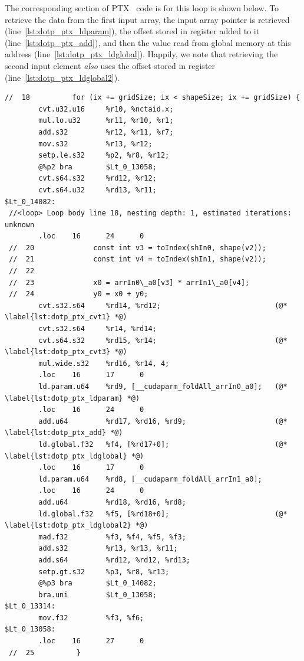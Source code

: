 The corresponding section of PTX~\cite{NVIDIA:2012vj} code is for this loop is
shown below. To retrieve the data from the first input array, the input array
pointer is retrieved (line~\ref{lst:dotp_ptx_ldparam}), the offset stored in
register  added to it (line~\ref{lst:dotp_ptx_add}), and then the
value read from global memory at this address
(line~\ref{lst:dotp_ptx_ldglobal}). Happily, we note that retrieving the second
input element \emph{also} uses the offset stored in register 
(line~\ref{lst:dotp_ptx_ldglobal2}).
%
\begin{lstlisting}[style=ptx
    ,firstnumber=103
    ,label=lst:dotp_ptx
    ,caption={Corresponding PTX code for the first step of fused dot product}]
 //  18          for (ix += gridSize; ix < shapeSize; ix += gridSize) {
        cvt.u32.u16     %r10, %nctaid.x;
        mul.lo.u32      %r11, %r10, %r1;
        add.s32         %r12, %r11, %r7;
        mov.s32         %r13, %r12;
        setp.le.s32     %p2, %r8, %r12;
        @%p2 bra        $Lt_0_13058;
        cvt.s64.s32     %rd12, %r12;
        cvt.s64.u32     %rd13, %r11;
$Lt_0_14082:
 //<loop> Loop body line 18, nesting depth: 1, estimated iterations: unknown
        .loc    16      24      0
 //  20              const int v3 = toIndex(shIn0, shape(v2));
 //  21              const int v4 = toIndex(shIn1, shape(v2));
 //  22
 //  23              x0 = arrIn0\_a0[v3] * arrIn1\_a0[v4];
 //  24              y0 = x0 + y0;
        cvt.s32.s64     %rd14, %rd12;                           (@* \label{lst:dotp_ptx_cvt1} *@)
        cvt.s32.s64     %r14, %rd14;
        cvt.s64.s32     %rd15, %r14;                            (@* \label{lst:dotp_ptx_cvt3} *@)
        mul.wide.s32    %rd16, %r14, 4;
        .loc    16      17      0
        ld.param.u64    %rd9, [__cudaparm_foldAll_arrIn0_a0];   (@* \label{lst:dotp_ptx_ldparam} *@)
        .loc    16      24      0
        add.u64         %rd17, %rd16, %rd9;                     (@* \label{lst:dotp_ptx_add} *@)
        ld.global.f32   %f4, [%rd17+0];                         (@* \label{lst:dotp_ptx_ldglobal} *@)
        .loc    16      17      0
        ld.param.u64    %rd8, [__cudaparm_foldAll_arrIn1_a0];
        .loc    16      24      0
        add.u64         %rd18, %rd16, %rd8;
        ld.global.f32   %f5, [%rd18+0];                         (@* \label{lst:dotp_ptx_ldglobal2} *@)
        mad.f32         %f3, %f4, %f5, %f3;
        add.s32         %r13, %r13, %r11;
        add.s64         %rd12, %rd12, %rd13;
        setp.gt.s32     %p3, %r8, %r13;
        @%p3 bra        $Lt_0_14082;
        bra.uni         $Lt_0_13058;
$Lt_0_13314:
        mov.f32         %f3, %f6;
$Lt_0_13058:
        .loc    16      27      0
 //  25          }
\end{lstlisting}

